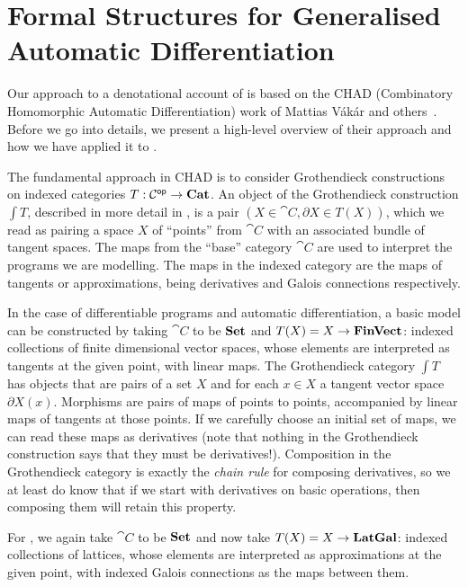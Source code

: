 \section{Formal Structures for Generalised Automatic Differentiation}

Our approach to a denotational account of \GPS is based on the CHAD (Combinatory Homomorphic Automatic Differentiation) work of Mattias Vákár and others~\cite{vákár22,nunes2023}. Before we go into details, we present a high-level overview of their approach and how we have applied it to \GPS.

The fundamental approach in CHAD is to consider Grothendieck constructions on indexed categories $T : \mathcal{C}^{\mathsf{op}} \to \mathbf{Cat}$. An object of the Grothendieck construction $\int T$, described in more detail in , is a pair $(X \in \cat{C}, \partial X \in T(X))$, which we read as pairing a space $X$ of ``points'' from $\cat{C}$ with an associated bundle of tangent spaces. The maps from the ``base'' category $\cat{C}$ are used to interpret the programs we are modelling. The maps in the indexed category are the maps of tangents or approximations, being derivatives and Galois connections respectively.

In the case of differentiable programs and automatic differentiation, a basic model can be constructed by taking $\cat{C}$ to be $\mathbf{Set}$ and $T(X) = X \to \mathbf{FinVect}$: indexed collections of finite dimensional vector spaces, whose elements are interpreted as tangents at the given point, with linear maps. The Grothendieck category $\int T$ has objects that are pairs of a set $X$ and for each $x \in X$ a tangent vector space $\partial X(x)$. Morphisms are pairs of maps of points to points, accompanied by linear maps of tangents at those points. If we carefully choose an initial set of maps, we can read these maps as derivatives (note that nothing in the Grothendieck construction says that they must be derivatives!). Composition in the Grothendieck category is exactly the {\em chain rule} for composing derivatives, so we at least do know that if we start with derivatives on basic operations, then composing them will retain this property.

For \GPS, we again take $\cat{C}$ to be $\mathbf{Set}$ and now take $T(X) = X \to \mathbf{LatGal}$: indexed collections of lattices, whose elements are interpreted as approximations at the given point, with indexed Galois connections as the maps between them.

